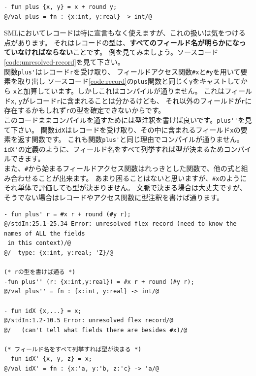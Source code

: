 \documentclass[11pt,a4paper]{article}
\begin{document}
\begin{lstlisting}[caption=レコードのパターンマッチ時の変数名の省略,label=code:omit-variables]
- fun plus {x, y} = x + round y;
@/val plus = fn : {x:int, y:real} -> int/@
\end{lstlisting}

SMLにおいてレコードは特に宣言もなく使えますが、これの扱いは気をつける点があります。
それはレコードの型は、\textbf{すべてのフィールド名が明らかになっていなければならない}ことです。
例を見てみましょう。ソースコード\ref{code:unresolved-record}を見て下さい。\\
関数\lstinline{plus'}はレコード\lstinline{r}を受け取り、
フィールドアクセス関数\lstinline{#x}と\lstinline{#y}を用いて要素を取り出し
ソースコード\ref{code:record}の\lstinline{plus}関数と同じく\lstinline{y}をキャストしてから
\lstinline{x}と加算しています。しかしこれはコンパイルが通りません。
これはフィールド\lstinline{x}, \lstinline{y}がレコード\lstinline{r}に含まれることは分かるけども、
それ以外のフィールドが\lstinline{r}に存在するかもしれず\lstinline{r}の型を確定できないからです。\\
このコードままコンパイルを通すためには型注釈を書けば良いです。\lstinline{plus''}を見て下さい。
関数\lstinline{idX}はレコードを受け取り、その中に含まれるフィールド\lstinline{x}の要素を返す関数です。
これも関数\lstinline{plus'}と同じ理由でコンパイルが通りません。
\lstinline{idX'}の定義のように、フィールド名をすべて列挙すれば型が決まるためコンパイルできます。\\
また、\lstinline{#}から始まるフィールドアクセス関数はれっきとした関数で、他の式と組み合わせることが出来ます。
あまり困ることはないと思いますが、\lstinline{#x}のようにそれ単体で評価しても型が決まりません。
文脈で決まる場合は大丈夫ですが、そうでない場合はレコードやアクセス関数に型注釈を書けば通ります。

\begin{lstlisting}[caption=フィールド名が解決出来ない例,label=code:unresolved-record]
- fun plus' r = #x r + round (#y r);
@/stdIn:25.1-25.34 Error: unresolved flex record (need to know the names of ALL the fields
 in this context)/@
@/  type: {x:int, y:real; 'Z}/@

(* rの型を書けば通る *)
-fun plus'' (r: {x:int,y:real}) = #x r + round (#y r);
@/val plus'' = fn : {x:int, y:real} -> int/@

- fun idX {x,...} = x;
@/stdIn:1.2-10.5 Error: unresolved flex record/@
@/   (can't tell what fields there are besides #x)/@

(* フィールド名をすべて列挙すれば型が決まる *)
- fun idX' {x, y, z} = x;
@/val idX' = fn : {x:'a, y:'b, z:'c} -> 'a/@
\end{lstlisting}
\end{document}
